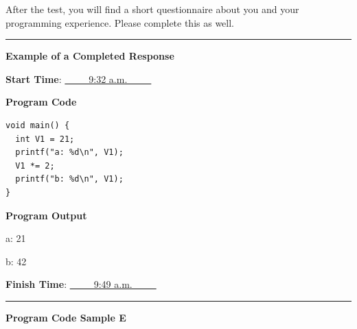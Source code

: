 \documentclass[12pt, a4paper, oneside]{article}
\begin{document}
After the test, you will find a short questionnaire about you and your
programming experience. Please complete this as well.

\begin{center}\rule{0.8\linewidth}{2pt}\end{center}


\textbf{Example of a Completed Response}

\vspace{10pt}

\textbf{Start Time}: \underline{~~~~~9:32 a.m.~~~~~}

\vspace{10pt}

\textbf{Program Code}

\begin{lstlisting}
void main() {
  int V1 = 21;
  printf("a: %d\n", V1);
  V1 *= 2;
  printf("b: %d\n", V1);
}
\end{lstlisting}

\textbf{Program Output}

a: 21

b: 42

\textbf{Finish Time}: \underline{~~~~~9:49 a.m.~~~~~}

\begin{center}\rule{0.8\linewidth}{2pt}\end{center}

  \pagebreak


\textbf{Program Code Sample E}

\vspace{20pt}


\end{document}

